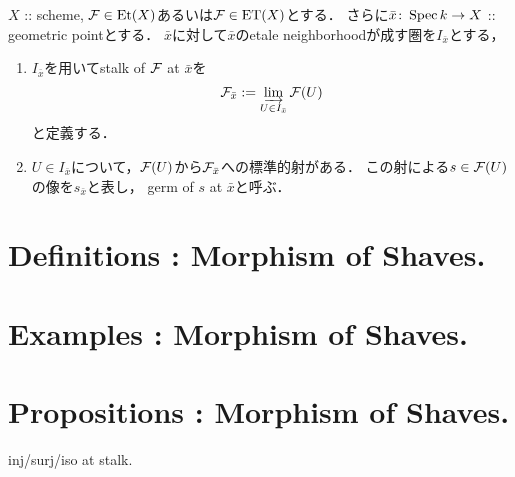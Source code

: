 \documentclass[a4paper]{jsarticle}
\begin{document}
\begin{Def}
    $X$ :: scheme,
    $\mathcal{F} \in \mathrm{Et}(X)$あるいは$\mathcal{F} \in \mathrm{ET}(X)$とする．
    さらに$\bar{x} \colon \operatorname{Spec} k \to X$ :: geometric pointとする．
    $\bar{x}$に対して$\bar{x}$のetale neighborhoodが成す圏を$I_{\bar{x}}$とする，

    \begin{enumerate}[label=(\roman*)]
        \item 
        $I_{\bar{x}}$を用いてstalk of $\mathcal{F}$ at $\bar{x}$を
        \[ \mathcal{F}_{\bar{x}}:=\varinjlim_{U \in I_{\bar{x}}} \mathcal{F}(U) \]
        と定義する．

        \item
        $U \in I_{\bar{x}}$について，$\mathcal{F}(U)$から$\mathcal{F}_{\bar{x}}$への標準的射がある．
        この射による$s \in \mathcal{F}(U)$の像を$s_{\bar{x}}$と表し，
        germ of $s$ at $\bar{x}$と呼ぶ．
    \end{enumerate}
\end{Def}

\section{Definitions : Morphism of Shaves.}
\begin{Def}
\end{Def}

\begin{Def}
\end{Def}

\section{Examples : Morphism of Shaves.}

\section{Propositions : Morphism of Shaves.}
\begin{Prop}
    inj/surj/iso at stalk.
\end{Prop}



\end{document}
